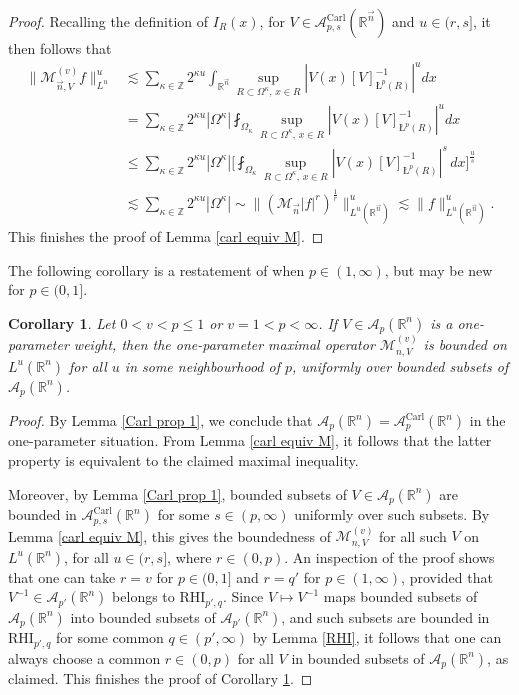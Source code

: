 \documentclass[11pt, reqno]{amsart}
\newtheorem{corollary}[theorem]{Corollary}
\theoremstyle{definition}
\theoremstyle{remark}
\numberwithin{equation}{section}
\newcommand{\A}{\mathscr A}
\newcommand{\R}{\mathbb R}
\newcommand{\Z}{\mathbb Z}
\newcommand{\vn}{\vec n}
\newcommand{\aveL}{\textit{\L}}
\newcommand{\abs}[1]{|#1|}
\newcommand{\Norm}[2]{\|#1\|_{#2}}
\newcommand{\bNorm}[2]{\big\|#1\big\|_{#2}}
\newcommand{\BNorm}[2]{\Big\|#1\Big\|_{#2}}
\newcommand{\Carl}{\mathrm{Carl}}
\newcommand{\RHI}{\mathrm{RHI}}
\newcommand{\AC}{\A^{\Carl}}
\begin{document}
\begin{proof}
Recalling the definition of $I_R(x)$, for $V\in\AC_{p,s}(\R^{\vn})$ and $u\in(r,s]$, it then follows that
\begin{align*}
\bNorm{\mathcal M_{\vn,V}^{(v)}f}{L^u}^u
&\lesssim\sum_{\kappa\in\Z} 2^{\kappa u} \int_{\R^{\vn}}\sup_{R\subset\Omega^\kappa,\, x\in R} \abs{V(x)[V]_{\aveL^p(R)}^{-1}}^u dx \\
&=\sum_{\kappa\in\Z} 2^{\kappa u}\abs{\Omega^\kappa} \fint_{\Omega_\kappa}\sup_{R\subset\Omega^\kappa,\, x\in R} \abs{V(x)[V]_{\aveL^p(R)}^{-1}}^u dx \\
&\leq\sum_{\kappa\in\Z} 2^{\kappa u}\abs{\Omega^\kappa}
\bigg[ \fint_{\Omega_\kappa}\sup_{R\subset\Omega^\kappa,\, x\in R} \abs{V(x)[V]_{\aveL^p(R)}^{-1}}^s \, dx \bigg]^{\frac us} \\
&\lesssim \sum_{\kappa\in\Z} 2^{\kappa u}\abs{\Omega^\kappa}
\sim \BNorm{(\mathcal M_{\vn}\abs{f}^r)^{\frac 1r}}{L^u(\R^{\vn})}^u
\lesssim \Norm{f}{L^u(\R^{\vn})}^u.
\end{align*}
This finishes the proof of Lemma \ref{carl equiv M}.
\end{proof}

The following corollary is a restatement of \cite[Theorem 3.2]{Gold03} when $p\in(1,\infty)$, but may be new for $p\in(0,1]$.

\begin{corollary}\label{MVbd}
Let $0<v<p\leq 1$ or $v=1<p<\infty$. If $V\in\A_p(\R^{n})$ is a one-parameter weight, then the one-parameter maximal operator $\mathcal M_{n,V}^{(v)}$ is bounded on $L^u(\R^{n})$ for all $u$ in some neighbourhood of $p$, uniformly over bounded subsets of $\A_p(\R^n)$.
\end{corollary}

\begin{proof}
By Lemma \ref{Carl prop 1}, we conclude that
$\A_p(\R^{n})=\AC_p(\R^n)$ in the one-parameter situation.
From Lemma \ref{carl equiv M}, it follows that
the latter property is equivalent to the claimed maximal inequality.

Moreover, by Lemma \ref{Carl prop 1}, bounded subsets of $V\in\A_p(\R^n)$ are bounded in $\AC_{p,s}(\R^n)$ for some $s\in(p,\infty)$ uniformly over such subsets. By Lemma \ref{carl equiv M}, this gives the boundedness of $\mathcal M_{n,V}^{(v)}$ for all such $V$ on $L^u(\R^n)$, for all $u\in(r,s]$, where $r\in(0,p)$. An inspection of the proof shows that one can take $r=v$ for $p\in(0,1]$ and $r=q'$ for $p\in(1,\infty)$, provided that $V^{-1}\in\A_{p'}(\R^n)$ belongs to $\RHI_{p',q}$. Since $V\mapsto V^{-1}$ maps bounded subsets of $\A_p(\R^n)$ into bounded subsets of $\A_{p'}(\R^n)$, and such subsets are bounded in $\RHI_{p',q}$ for some common $q\in(p',\infty)$ by Lemma \ref{RHI}, it follows that one can always choose a common $r\in(0,p)$ for all $V$ in bounded subsets of $\A_p(\R^n)$, as claimed.
This finishes the proof of Corollary \ref{MVbd}.
\end{proof}
\end{document}
